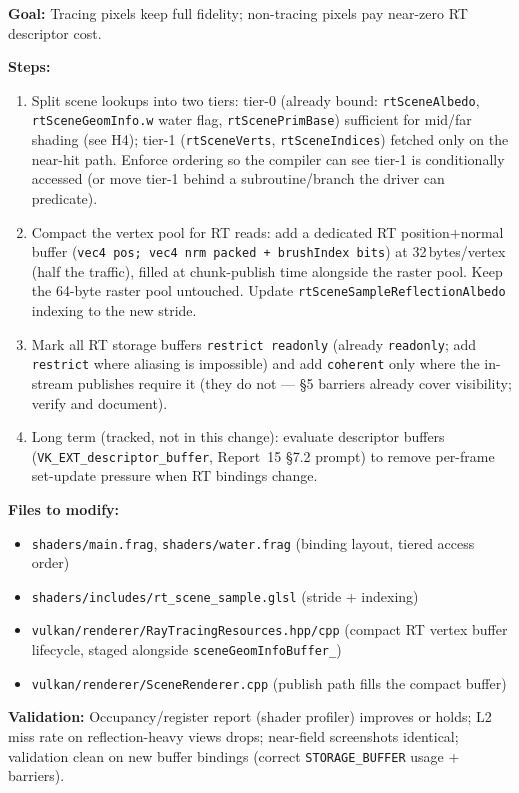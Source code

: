 \documentclass[11pt,a4paper]{article}
\begin{document}
\begin{tcolorbox}[promptbox={Prompt: Slim Fragment-Stage RT Working Set}]
\textbf{Goal:} Tracing pixels keep full fidelity; non-tracing pixels pay near-zero RT descriptor cost.

\textbf{Steps:}
\begin{enumerate}
    \item Split scene lookups into two tiers: tier-0 (already bound: \texttt{rtSceneAlbedo}, \texttt{rtSceneGeomInfo.w} water flag, \texttt{rtScenePrimBase}) sufficient for mid/far shading (see H4); tier-1 (\texttt{rtSceneVerts}, \texttt{rtSceneIndices}) fetched only on the near-hit path. Enforce ordering so the compiler can see tier-1 is conditionally accessed (or move tier-1 behind a subroutine/branch the driver can predicate).
    \item Compact the vertex pool for RT reads: add a dedicated RT position$+$normal buffer (\texttt{vec4 pos; vec4 nrm packed + brushIndex bits}) at 32\,bytes/vertex (half the traffic), filled at chunk-publish time alongside the raster pool. Keep the 64-byte raster pool untouched. Update \texttt{rtSceneSampleReflectionAlbedo} indexing to the new stride.
    \item Mark all RT storage buffers \texttt{restrict readonly} (already \texttt{readonly}; add \texttt{restrict} where aliasing is impossible) and add \texttt{coherent} only where the in-stream publishes require it (they do not --- \S5 barriers already cover visibility; verify and document).
    \item Long term (tracked, not in this change): evaluate descriptor buffers (\texttt{VK\_EXT\_descriptor\_buffer}, Report~15 \S7.2 prompt) to remove per-frame set-update pressure when RT bindings change.
\end{enumerate}

\textbf{Files to modify:}
\begin{itemize}
    \item \texttt{shaders/main.frag}, \texttt{shaders/water.frag} (binding layout, tiered access order)
    \item \texttt{shaders/includes/rt\_scene\_sample.glsl} (stride + indexing)
    \item \texttt{vulkan/renderer/RayTracingResources.hpp/cpp} (compact RT vertex buffer lifecycle, staged alongside \texttt{sceneGeomInfoBuffer\_})
    \item \texttt{vulkan/renderer/SceneRenderer.cpp} (publish path fills the compact buffer)
\end{itemize}

\textbf{Validation:} Occupancy/register report (shader profiler) improves or holds; L2 miss rate on reflection-heavy views drops; near-field screenshots identical; validation clean on new buffer bindings (correct \texttt{STORAGE\_BUFFER} usage + barriers).
\end{tcolorbox}
\end{document}
